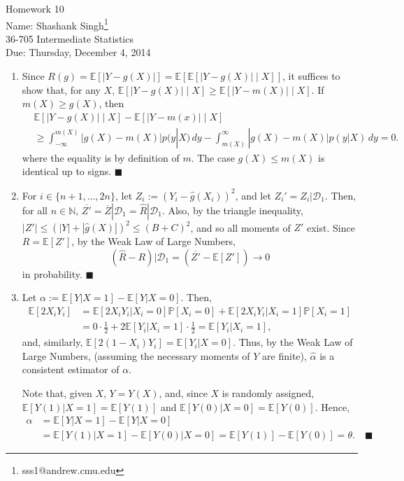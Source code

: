 \documentclass[11pt]{article}
\makeatletter
\newcommand{\myname}{Shashank Singh\footnote{sss1@andrew.cmu.edu}}
\newcommand{\myclass}{36-705 Intermediate Statistics}
\newcommand{\myhwnum}{10}
\newcommand{\duedate}{Thursday, December 4, 2014}
\renewcommand{\qed}{\quad \ensuremath{\blacksquare}}
\newcommand{\E}{\mathbb{E}} %
\newcommand{\pr}{\mathbb{P}} %
\newcommand{\N}{\mathbb{N}} %
\newcommand{\ol}{\overline}
\makeatother
\begin{document}
\thispagestyle{plain}

{\Large Homework \myhwnum} \\
Name: \myname \\
\myclass \\
Due: \duedate

\begin{enumerate}
\item Since $R(g) = \E[|Y - g(X)|] = \E[\E[|Y - g(X)|\;|\;X]]$, it suffices to
show that, for any $X$, $\E[|Y - g(X)|\;|\;X] \geq \E[|Y - m(X)|\;|\;X]$. If
$m(X) \geq g(X)$, then
\begin{align*}
 &  \E[|Y - g(X)|\;|\;X] - \E[|Y - m(x)|\;|\;X]    \\
 &  \geq \int_{-\infty}^{m(X)} |g(X) - m(X)| p(y|X) \, dy
    - \int_{m(X)}^{\infty} |g(X) - m(X)| p(y|X) \, dy
    = 0.
\end{align*}
where the equality is by definition of $m$. The case $g(X) \leq m(X)$ is
identical up to signs. \qed

\item For $i \in \{n + 1,\dots,2n\}$, let $Z_i := (Y_i - \hat g(X_i))^2$, and
let $Z_i' = Z_i | \mathcal{D}_1$. Then, for all $n \in \N$,
$\ol{Z'} = \ol Z | \mathcal{D}_1 = \hat R | \mathcal{D}_1$. Also, by the
triangle inequality, $|Z'| \leq (|Y| + |\hat g(X)|)^2 \leq (B + C)^2$, and so
all moments of $Z'$ exist. Since $R = \E[Z']$, by the Weak Law of Large
Numbers,
\[(\hat R - R) | \mathcal{D}_1 = \left( \ol{Z'} - \E[Z'] \right) \to 0\]
in probability. \qed

\item Let $\alpha := \E[Y | X = 1] - \E[Y | X = 0]$. Then,
\begin{align*}
\E[2X_iY_i]
 &  = \E[2X_iY_i | X_i = 0]\pr[X_i = 0] + \E[2X_iY_i | X_i = 1]\pr[X_i = 1] \\
 &  = 0 \cdot \frac12 + 2\E[Y_i | X_i = 1] \cdot \frac12
    = \E[Y_i | X_i = 1],
\end{align*}
and, similarly, $\E[2(1 - X_i)Y_i] = \E[Y_i | X = 0]$. Thus, by the Weak Law of
Large Numbers, (assuming the necessary moments of $Y$ are finite),
$\hat\alpha$ is a consistent estimator of $\alpha$.

Note that, given $X$, $Y = Y(X)$, and, since $X$ is randomly assigned,
$\E[Y(1) | X = 1] = \E[Y(1)]$ and $\E[Y(0) | X = 0] = \E[Y(0)]$. Hence,
\begin{align*}
\alpha
 &  = \E[Y | X = 1] - \E[Y | X = 0] \\
 &  = \E[Y(1) | X = 1] - \E[Y(0) | X = 0]
    = \E[Y(1)] - \E[Y(0)]
    = \theta. \qed
\end{align*}

\end{enumerate}
\end{document}
